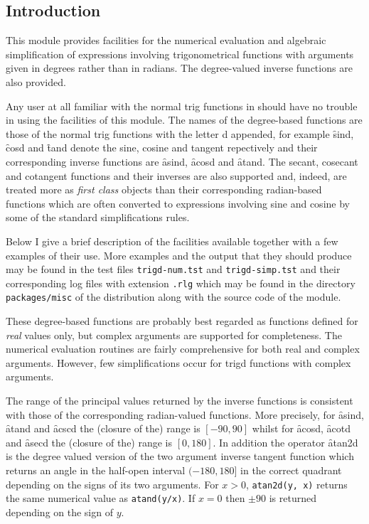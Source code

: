 
 
\subsection{Introduction}
This module provides facilities for the numerical evaluation and algebraic simplification of expressions involving  trigonometrical functions with arguments given in degrees rather than in radians.  The degree-valued inverse functions are also provided.  

Any user at all familiar with the normal trig functions in {\REDUCE} should have no trouble in using the facilities of this module.  The names of the degree-based functions are those of the normal trig functions with the letter d appended, for example \f{sind}, \f{cosd} and \f{tand} denote the sine, cosine and tangent repectively and their corresponding inverse functions are \f{asind}, \f{acosd} and \f{atand}.  The secant, cosecant and cotangent functions and their inverses are also supported and, indeed, are treated more as \textit{first class} objects than their corresponding radian-based functions which are often converted to expressions involving sine and cosine by some of the standard {\REDUCE} simplifications rules.   

Below I give a brief description of the facilities available together with a few examples of their use.  More examples and the output that they should produce may be found in the test files \texttt{trigd-num.tst} and \texttt{trigd-simp.tst} and their corresponding log files with extension \texttt{.rlg} which may be found in the directory \texttt{packages/misc} of the {\REDUCE} distribution along with the source code of the module.

These degree-based functions are probably best regarded as functions defined for \emph{real} values only, but  complex arguments  are supported for completeness.  The numerical evaluation routines are fairly comprehensive for both real and complex arguments.
However, few simplifications occur for trigd functions with complex arguments.

The range of the principal values returned by the inverse functions is consistent with those of the corresponding radian-valued functions. More precisely, for \f{asind}, \f{atand} and  \f{acscd}  the (closure of the) range is $[-90, 90]$ whilst for \f{acosd}, \f{acotd} and  \f{asecd}  the (closure of the) range is $[0, 180]$.  In addition the operator \f{atan2d} is the degree valued version of the two argument inverse tangent function which returns an angle in the half-open interval $(-180, 180]$ in the correct quadrant depending on the signs of its two arguments.  For $x>0$,  \texttt{atan2d(y, x)} returns the same numerical value as  \texttt{atand(y/x)}. If $x=0$ then $\pm 90$ is returned depending on the sign of $y$.

